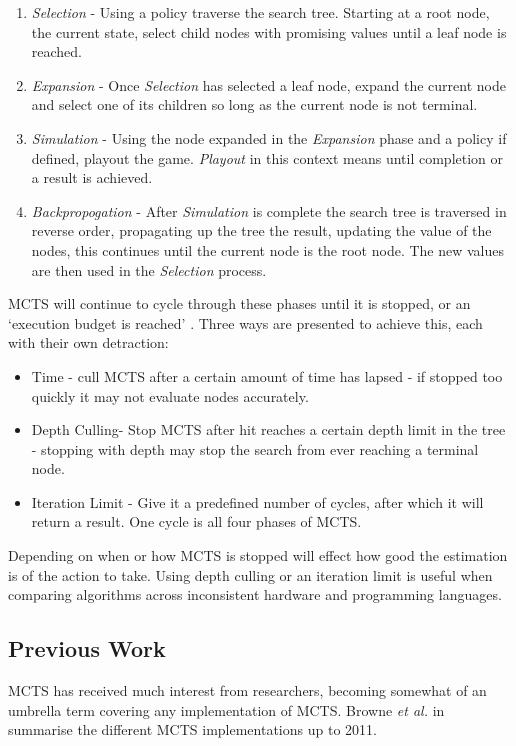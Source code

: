 \begin{enumerate}
  \item {\em Selection} - Using a policy traverse the search tree. Starting at a root node, the current state, select child nodes with promising values until a leaf node is reached.
  \item {\em Expansion} - Once {\em Selection} has selected a leaf node, expand the current node and select one of its children so long as the current node is not terminal.   
  \item {\em Simulation} - Using the node expanded in the {\em Expansion} phase and a policy if defined, playout the game. {\em Playout} in this context means until completion or a result is achieved.
  \item {\em Backpropogation} - After {\em Simulation} is complete the search tree is traversed in reverse order, propagating up the tree the result, updating the value of the nodes, this continues until the current node is the root node. The new values are then used in the {\em Selection} process.
\end{enumerate}

MCTS will continue to cycle through these phases until it is stopped, or an `execution budget is reached' \cite{b6}. Three ways are presented to achieve this, each with their own detraction:
\begin{itemize}
  \item Time - cull MCTS after a certain amount of time has lapsed - if stopped too quickly it may not evaluate nodes accurately.
  \item Depth Culling- Stop MCTS after hit reaches a certain depth limit in the tree - stopping with depth may stop the search from ever reaching a terminal node.
  \item Iteration Limit - Give it a predefined number of cycles, after which it will return a result. One cycle is all four phases of MCTS.
\end{itemize}

Depending on when or how MCTS is stopped will effect how good the estimation is of the action to take. Using depth culling or an iteration limit is useful when comparing algorithms across inconsistent hardware and programming languages.

\subsection{Previous Work}
MCTS has received much interest from researchers, becoming somewhat of an umbrella term covering any implementation of MCTS. Browne {\em et al.} in \cite{b2} summarise the different MCTS implementations up to 2011.

